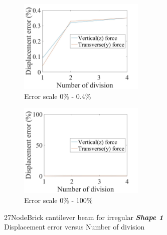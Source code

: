\documentclass[fleqn,11pt,letter]{article}
\begin{document}
\begin{figure}[H]
  \begin{subfigure}{0.5\textwidth}
    \centering
    \includegraphics[width=6cm]{../Figure_files/27NodeBrick/error27brick_beam_irregular_shape1.jpeg}
    \caption{Error scale 0\% - 0.4\%}
  \end{subfigure}
  \begin{subfigure}{0.5\textwidth}
    \centering
    \includegraphics[width=6cm]{../Figure_files/27NodeBrick/error27brick_beam_irregular_shape1100.jpeg}
    \caption{Error scale 0\% - 100\%}
  \end{subfigure}
  \captionsetup{justification=centering,margin=3cm}
  \caption{27NodeBrick cantilever beam for irregular \textbf{\emph{Shape 1}}\\
      Displacement error   versus   Number of division}
  \label{fig shape 1 27NodeBrick cantilever beam for irregular more elements}
\end{figure}


\end{document}
